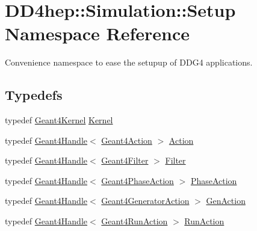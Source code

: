 \hypertarget{namespace_d_d4hep_1_1_simulation_1_1_setup}{}\section{D\+D4hep\+:\+:Simulation\+:\+:Setup Namespace Reference}
\label{namespace_d_d4hep_1_1_simulation_1_1_setup}


Convenience namespace to ease the setupup of D\+D\+G4 applications.  


\subsection*{Typedefs}
\begin{DoxyCompactItemize}
\item 
typedef \hyperlink{class_d_d4hep_1_1_simulation_1_1_geant4_kernel}{Geant4\+Kernel} \hyperlink{namespace_d_d4hep_1_1_simulation_1_1_setup_a463a13fee8e841935ffc1c013755240e}{Kernel}
\item 
typedef \hyperlink{class_d_d4hep_1_1_simulation_1_1_geant4_handle}{Geant4\+Handle}$<$ \hyperlink{class_d_d4hep_1_1_simulation_1_1_geant4_action}{Geant4\+Action} $>$ \hyperlink{namespace_d_d4hep_1_1_simulation_1_1_setup_aa958972310161bf099d9d22e59d257ab}{Action}
\item 
typedef \hyperlink{class_d_d4hep_1_1_simulation_1_1_geant4_handle}{Geant4\+Handle}$<$ \hyperlink{class_d_d4hep_1_1_simulation_1_1_geant4_filter}{Geant4\+Filter} $>$ \hyperlink{namespace_d_d4hep_1_1_simulation_1_1_setup_ad8d99728c073de63615427fbb8a1992a}{Filter}
\item 
typedef \hyperlink{class_d_d4hep_1_1_simulation_1_1_geant4_handle}{Geant4\+Handle}$<$ \hyperlink{class_d_d4hep_1_1_simulation_1_1_geant4_phase_action}{Geant4\+Phase\+Action} $>$ \hyperlink{namespace_d_d4hep_1_1_simulation_1_1_setup_a2dad27b7db15a1ff3882c15d5182eb2b}{Phase\+Action}
\item 
typedef \hyperlink{class_d_d4hep_1_1_simulation_1_1_geant4_handle}{Geant4\+Handle}$<$ \hyperlink{class_d_d4hep_1_1_simulation_1_1_geant4_generator_action}{Geant4\+Generator\+Action} $>$ \hyperlink{namespace_d_d4hep_1_1_simulation_1_1_setup_a14c151f5ea2ebe374531259e0a2d5446}{Gen\+Action}
\item 
typedef \hyperlink{class_d_d4hep_1_1_simulation_1_1_geant4_handle}{Geant4\+Handle}$<$ \hyperlink{class_d_d4hep_1_1_simulation_1_1_geant4_run_action}{Geant4\+Run\+Action} $>$ \hyperlink{namespace_d_d4hep_1_1_simulation_1_1_setup_a9a6172ddf65752b351495ec3d99c6379}{Run\+Action}

\end{DoxyCompactItemize}
